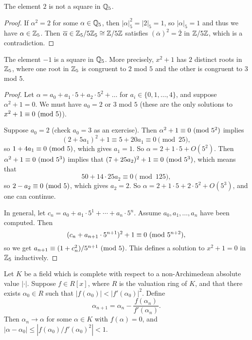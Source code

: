 \begin{prop}
  The element $2$ is not a square in $\mathbb{Q}_5$.
\end{prop}

\begin{proof}
  If $\alpha^2 = 2$ for some $\alpha \in \mathbb{Q}_5$, then
  $|\alpha|_5^2 = |2|_5 = 1$,
  so $|\alpha|_5 = 1$ and thus we have $\alpha \in \mathbb{Z}_5$.
  Then $\overline{\alpha} \in \mathbb{Z}_5 / 5 \mathbb{Z}_5 \cong \mathbb{Z} / 5\mathbb{Z}$
  satisfies $(\overline{\alpha})^2 = \overline{2}$
  in $\mathbb{Z} / 5 \mathbb{Z}$, which is a contradiction.
\end{proof}

\begin{prop}
  The element $-1$ is a square in $\mathbb{Q}_5$. More
  precisely, $x^2 + 1$ has $2$ distinct roots in $\mathbb{Z}_5$,
  where one root in $\mathbb{Z}_5$ is congruent to $2$ mod $5$
  and the other is congruent to $3$ mod $5$.
\end{prop}

\begin{proof}
  Let $\alpha = a_0 + a_1 \cdot 5 + a_2 \cdot 5^2 + \dots$
  for $a_i \in \{0, 1, \dots, 4\}$, and suppose
  $\alpha^2 + 1 = 0$. We must have
  $a_0 = 2$ or $3$ mod $5$ (these are the only solutions
  to $x^2 + 1 \equiv 0 \ (\mathrm{mod}\ 5)$).

  Suppose $a_0 = 2$ (check $a_0 = 3$ as an exercise).
  Then $\alpha^2 + 1 \equiv 0 \ (\mathrm{mod}\ 5^2)$ implies
  \[
    (2 + 5a_1)^2 + 1 \equiv 5 + 20 a_1 \equiv 0 \pmod{25},
  \]
  so $1 + 4 a_1 \equiv 0 \ (\mathrm{mod}\ 5)$, which gives
  $a_1 = 1$. So $\alpha = 2 + 1 \cdot 5 + O(5^2)$.
  Then $\alpha^2 + 1 \equiv 0 \ (\mathrm{mod}\ 5^3)$ implies
  that $(7 + 25 a_2)^2 + 1 \equiv 0 \ (\mathrm{mod}\ 5^3)$,
  which means that
  \[
    50 + 14 \cdot 25 a_2 \equiv 0 \pmod{125},
  \]
  so $2 - a_2 \equiv 0 \ (\mathrm{mod}\ 5)$, which gives
  $a_2 = 2$. So $\alpha = 2 + 1 \cdot 5 + 2 \cdot 5^2 + O(5^3)$, and one can continue.

  In general, let $c_n = a_0 + a_1 \cdot 5^1 + \cdots + a_n \cdot 5^n$.
  Assume $a_0, a_1, \dots, a_n$ have been computed.
  Then
  \[
    (c_n + a_{n + 1} \cdot 5^{n + 1})^2 + 1 \equiv 0 \ (\mathrm{mod}\ 5^{n + 2}),
  \]
  so we get $a_{n + 1} \equiv (1 + c_n^2) / 5^{n + 1} \ (\mathrm{mod}\ 5)$.
  This defines a solution to $x^2 + 1 = 0$ in $\mathbb{Z}_5$
  inductively.
\end{proof}

\begin{prop}
  Let $K$ be a field which is complete with respect
  to a non-Archimedean absolute value $|\cdot|$.
  Suppose $f \in R[x]$, where $R$ is the valuation
  ring of $K$, and that there exists $\alpha_0 \in R$
  such that $|f(\alpha_0)| < |f'(\alpha_0)|^2$.
  Define
  \[
    \alpha_{n + 1} = \alpha_n - \frac{f(\alpha_n)}{f'(\alpha_n)}.
  \]
  Then $\alpha_n \to \alpha$ for some
  $\alpha \in K$ with $f(\alpha) = 0$, and
  $|\alpha - \alpha_0| \le |f(\alpha_0) / f'(\alpha_0)^2| < 1$.
\end{prop}

